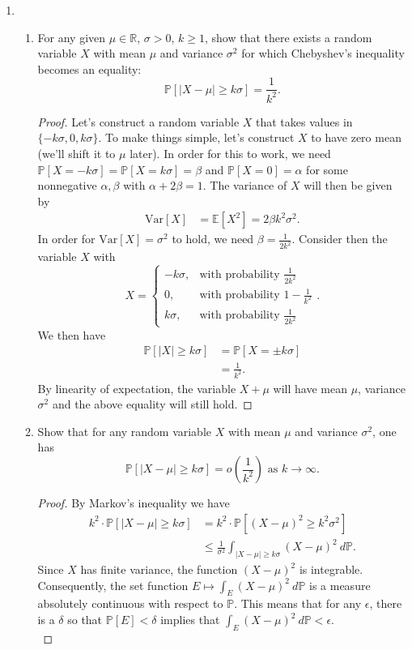 \documentclass[11pt,letterpaper]{report}
\newcommand{\reals}{\mathbb{R}}
\newcommand{\E}{\mathbb{E}}
\newcommand{\Prob}{\mathbb{P}}
\newcommand{\Var}{\text{Var}}
\begin{document}
\begin{enumerate}
	\item \begin{enumerate}
		\item For any given $\mu\in\reals$, $\sigma>0$, $k\geq 1$, show that there exists a random variable $X$ with mean $\mu$ and variance $\sigma^2$ for which Chebyshev's inequality becomes an equality:
		\[
		\Prob[|X-\mu|\geq k\sigma] = \frac{1}{k^2}.
		\]
		\begin{proof}
			Let's construct a random variable $X$ that takes values in $\{-k\sigma, 0, k\sigma\}$. To make things simple, let's construct $X$ to have zero mean (we'll shift it to $\mu$ later). In order for this to work, we need $\Prob[X = -k\sigma] = \Prob[X = k\sigma] = \beta$ and $\Prob[X = 0] = \alpha$ for some nonnegative $\alpha,\beta$ with $\alpha+2\beta = 1$. The variance of $X$ will then be given by
			\begin{align*}
				\Var[X] &= \E[X^2] = 2\beta k^2\sigma^2.
			\end{align*}
			In order for $\Var[X] = \sigma^2$ to hold, we need $\beta = \frac{1}{2k^2}$. Consider then the variable $X$ with
			\[
			X = \begin{cases}
				-k\sigma,&\text{with probability }\frac{1}{2k^2}\\
				0,&\text{with probability }1-\frac{1}{k^2}\\
				k\sigma,&\text{with probability }\frac{1}{2k^2}
			\end{cases}.
			\]
			We then have
			\begin{align*}
				\Prob[|X|\geq k\sigma] &= \Prob[X = \pm k\sigma]\\
				&= \frac{1}{k^2}.
			\end{align*}
			By linearity of expectation, the variable $X + \mu$ will have mean $\mu$, variance $\sigma^2$ and the above equality will still hold.
		\end{proof}

		\item Show that for any random variable $X$ with mean $\mu$ and variance $\sigma^2$, one has
		\[
		\Prob[|X-\mu|\geq k\sigma] = o\left(\frac{1}{k^2}\right)\text{ as }k\to \infty.
		\]
		\begin{proof}
			By Markov's inequality we have
			\begin{equation}\label{mark}
			\begin{split}
				k^2\cdot \Prob[|X-\mu|\geq k\sigma] &= k^2\cdot \Prob[(X-\mu)^2\geq k^2\sigma^2]\\
				&\leq \frac{1}{\sigma^2}\int_{|X-\mu|\geq k\sigma}(X-\mu)^2\ d\Prob.
			\end{split}
			\end{equation}
			Since $X$ has finite variance, the function $(X-\mu)^2$ is integrable. Consequently, the set function $E\mapsto \int_E(X-\mu)^2\ d\Prob$ is a measure absolutely continuous with respect to $\Prob$. This means that for any $\epsilon$, there is a $\delta$ so that $\Prob[E]<\delta$ implies that $\int_E(X-\mu)^2\ d\Prob<\epsilon$.\\


\end{proof}
\end{enumerate}
\end{enumerate}
\end{document}
